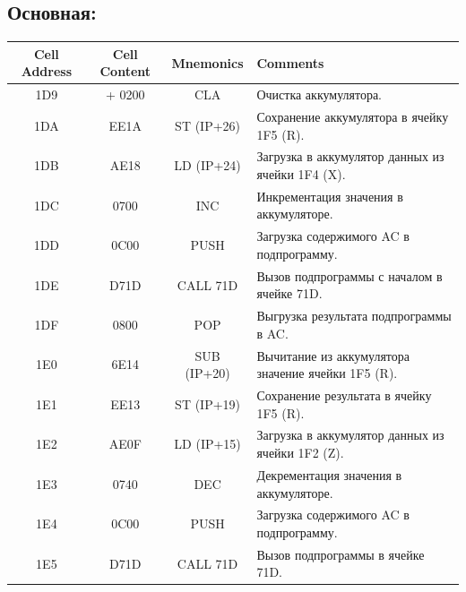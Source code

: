 \subsection{Основная:}
\begin{center}
    \begin{tabular}{|c|c|c|l|}
        \hline
        \textbf{Cell Address} & \textbf{Cell Content} & \textbf{Mnemonics} & \textbf{Comments}                                    \\
        \hline
        1D9                   & + 0200                & CLA                & Очистка аккумулятора.                                \\
        1DA                   & EE1A                  & ST (IP+26)         & Сохранение аккумулятора в ячейку 1F5 (R).            \\
        1DB                   & AE18                  & LD (IP+24)         & Загрузка в аккумулятор данных из ячейки 1F4 (X).     \\
        1DC                   & 0700                  & INC                & Инкрементация значения в аккумуляторе.               \\
        1DD                   & 0C00                  & PUSH               & Загрузка содержимого AC в подпрограмму.              \\
        1DE                   & D71D                  & CALL 71D           & Вызов подпрограммы с началом в ячейке 71D.           \\
        1DF                   & 0800                  & POP                & Выгрузка результата подпрограммы в AC.               \\
        1E0                   & 6E14                  & SUB (IP+20)        & Вычитание из аккумулятора значение ячейки 1F5 (R).   \\
        1E1                   & EE13                  & ST (IP+19)         & Сохранение результата в ячейку 1F5 (R).              \\
        1E2                   & AE0F                  & LD (IP+15)         & Загрузка в аккумулятор данных из ячейки 1F2 (Z).     \\
        1E3                   & 0740                  & DEC                & Декрементация значения в аккумуляторе.               \\
        1E4                   & 0C00                  & PUSH               & Загрузка содержимого AC в подпрограмму.              \\
        1E5                   & D71D                  & CALL 71D           & Вызов подпрограммы в ячейке 71D.                     \\

\end{tabular}
\end{center}
